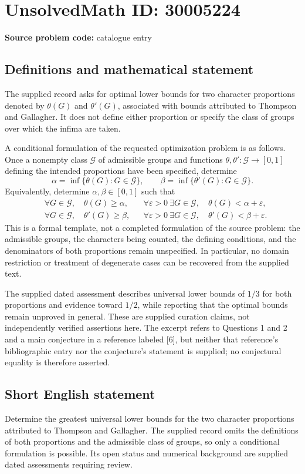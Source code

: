 \documentclass[11pt]{article}
\begin{document}
\section*{UnsolvedMath ID: 30005224}
\textbf{Source problem code:} catalogue entry
\subsection{Definitions and mathematical statement}
The supplied record asks for optimal lower bounds for two character proportions denoted by \(\theta(G)\) and \(\theta'(G)\), associated with bounds attributed to Thompson and Gallagher. It does not define either proportion or specify the class of groups over which the infima are taken.

A conditional formulation of the requested optimization problem is as follows. Once a nonempty class \(\mathcal G\) of admissible groups and functions \(\theta,\theta'\colon\mathcal G\to[0,1]\) defining the intended proportions have been specified, determine
\[
\alpha=\inf\{\theta(G):G\in\mathcal G\},\qquad
\beta=\inf\{\theta'(G):G\in\mathcal G\}.
\]
Equivalently, determine \(\alpha,\beta\in[0,1]\) such that
\[
\begin{aligned}
&\forall G\in\mathcal G,\quad \theta(G)\geq\alpha,
&&\forall\varepsilon>0\ \exists G\in\mathcal G,\quad \theta(G)<\alpha+\varepsilon,\\
&\forall G\in\mathcal G,\quad \theta'(G)\geq\beta,
&&\forall\varepsilon>0\ \exists G\in\mathcal G,\quad \theta'(G)<\beta+\varepsilon.
\end{aligned}
\]
This is a formal template, not a completed formulation of the source problem: the admissible groups, the characters being counted, the defining conditions, and the denominators of both proportions remain unspecified. In particular, no domain restriction or treatment of degenerate cases can be recovered from the supplied text.

The supplied dated assessment describes universal lower bounds of \(1/3\) for both proportions and evidence toward \(1/2\), while reporting that the optimal bounds remain unproved in general. These are supplied curation claims, not independently verified assertions here. The excerpt refers to Questions 1 and 2 and a main conjecture in a reference labeled [6], but neither that reference's bibliographic entry nor the conjecture's statement is supplied; no conjectural equality is therefore asserted.
\subsection{Short English statement}
Determine the greatest universal lower bounds for the two character proportions attributed to Thompson and Gallagher. The supplied record omits the definitions of both proportions and the admissible class of groups, so only a conditional formulation is possible. Its open status and numerical background are supplied dated assessments requiring review.
\end{document}
